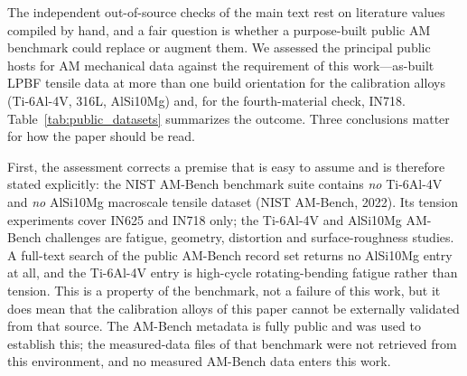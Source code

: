 \documentclass[11pt,a4paper,twocolumn]{article}
\begin{document}
The independent out-of-source checks of the main text rest on literature values compiled by hand, and a
fair question is whether a purpose-built public AM benchmark could replace or augment them. We assessed the
principal public hosts for AM mechanical data against the requirement of this work---as-built LPBF tensile
data at more than one build orientation for the calibration alloys (Ti-6Al-4V, 316L, AlSi10Mg) and, for the
fourth-material check, IN718. Table~\ref{tab:public_datasets} summarizes the outcome. Three conclusions
matter for how the paper should be read.

First, the assessment corrects a premise that is easy to assume and is therefore stated explicitly: the
NIST AM-Bench benchmark suite contains \emph{no} Ti-6Al-4V and \emph{no} AlSi10Mg macroscale tensile
dataset (NIST AM-Bench, 2022). Its tension experiments cover IN625 and IN718 only; the Ti-6Al-4V and
AlSi10Mg AM-Bench challenges are fatigue, geometry, distortion and surface-roughness studies. A
full-text search of the public AM-Bench record set returns no AlSi10Mg entry at all, and the Ti-6Al-4V
entry is high-cycle rotating-bending fatigue rather than tension. This is a property of the benchmark, not
a failure of this work, but it does mean that the calibration alloys of this paper cannot be externally
validated from that source. The AM-Bench metadata is fully public and was used to establish this; the
measured-data files of that benchmark were not retrieved from this environment, and no
measured AM-Bench data enters this work.
\end{document}
